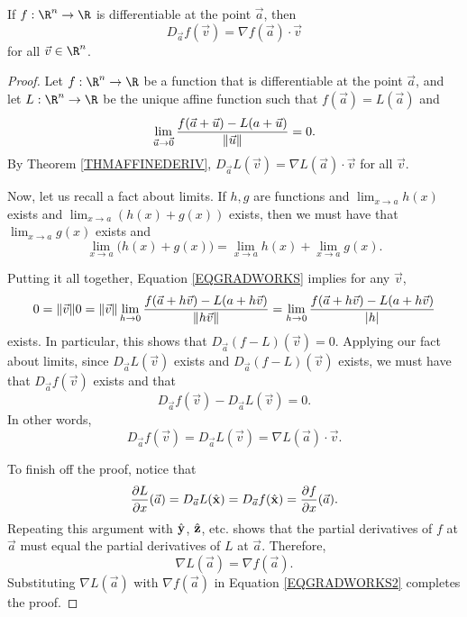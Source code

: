 \begin{theorem}
	\label{THMDIFFERENTIABLE}
	If $f:\R^n\to\R$ is differentiable at the point $\vec a$, then
	\[
		D_{\vec a}f(\vec v)=\nabla f(\vec a)\cdot \vec v
	\]
	for all $\vec v\in\R^n$.
\end{theorem}
\begin{proof}
	Let $f:\R^n\to\R$ be a function that is differentiable at
	the point $\vec a$, and let $L:\R^n\to\R$ be the unique affine function
	such that $f(\vec a)=L(\vec a)$ and 
	\begin{equation}
		\label{EQGRADWORKS}
		\lim_{\vec u\to\vec 0}
		\frac{f(\vec a+\vec u)-L(a+\vec u)}{\lVert\vec u\rVert}=0.
	\end{equation}
	By Theorem \ref{THMAFFINEDERIV}, $D_{\vec a}L(\vec v)=\nabla L(\vec a)\cdot \vec v$
	for all $\vec v$.

	Now, let us recall a fact about limits. If $h,g$ are functions and
	$\lim_{x\to a}h(x)$ exists and $\lim_{x\to a}(h(x)+g(x))$ exists, then
	we must have that $\lim_{x\to a}g(x)$ exists and
	\[
		\lim_{x\to a} \Big(h(x)+g(x)\Big)=
		\lim_{x\to a} h(x)+\lim_{x\to a}g(x).
	\]
	
	Putting it all together, Equation \eqref{EQGRADWORKS} implies
	for any $\vec v$,
	\[
		0=\lVert\vec v\rVert0=\lVert\vec v\rVert\lim_{h\to 0} 
		\frac{f(\vec a+h\vec v)-L(a+h\vec v)}{\lVert h\vec v\rVert}
		=
		\lim_{h\to 0} 
		\frac{f(\vec a+h\vec v)-L(a+h\vec v)}{\lvert h\rvert}
	\]
	exists.  In particular, this shows that $D_{\vec a}(f-L)(\vec v)=0$.
	Applying our fact about limits, since $D_{\vec a}L(\vec v)$ exists
	and $D_{\vec a}(f-L)(\vec v)$ exists, we must have that $D_{\vec a}f(\vec v)$
	exists and that
	\[
		D_{\vec a}f(\vec v) - D_{\vec a}L(\vec v)=0.
	\]
	In other words,
	\begin{equation}
		\label{EQGRADWORKS2}
		D_{\vec a}f(\vec v) = D_{\vec a}L(\vec v) = \nabla L(\vec a)\cdot \vec v.
	\end{equation}

	To finish off the proof, notice that
	\[
		\frac{\partial L}{\partial x}(\vec a)=
		D_{\vec a}L({\hat {\mathbf x}}) = D_{\vec a}f({\hat {\mathbf x}})=\frac{\partial f}{\partial x}(\vec a).
	\]
	Repeating this argument with ${\hat {\mathbf y}}$,
	${\hat {\mathbf z}}$, etc\mbox{.} shows that the partial derivatives of $f$ at $\vec a$
	must equal the partial derivatives of $L$ at $\vec a$.  Therefore,
	\[
		\nabla L(\vec a)=\nabla f(\vec a).
	\]
	Substituting $\nabla L(\vec a)$ with $\nabla f(\vec a)$ in Equation
	\eqref{EQGRADWORKS2} completes the proof.
\end{proof}

